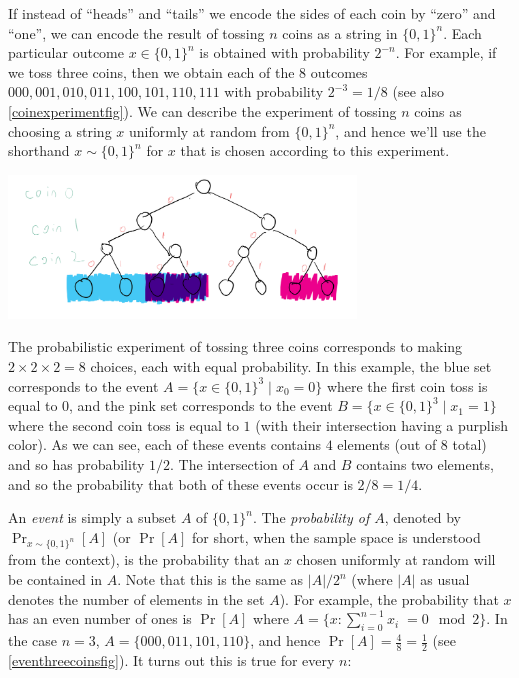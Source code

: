 If instead of ``heads'' and ``tails'' we encode the sides of each coin
by ``zero'' and ``one'', we can encode the result of tossing \(n\) coins
as a string in \(\{0,1\}^n\). Each particular outcome \(x\in \{0,1\}^n\)
is obtained with probability \(2^{-n}\). For example, if we toss three
coins, then we obtain each of the 8 outcomes
\(000,001,010,011,100,101,110,111\) with probability \(2^{-3}=1/8\) (see
also \cref{coinexperimentfig}). We can describe the experiment of
tossing \(n\) coins as choosing a string \(x\) uniformly at random from
\(\{0,1\}^n\), and hence we'll use the shorthand \(x\sim \{0,1\}^n\) for
\(x\) that is chosen according to this experiment.

\begin{marginfigure}
\centering
\includegraphics[width=\linewidth, height=1.5in, keepaspectratio]{../figure/coinexperiment.png}
\caption{The probabilistic experiment of tossing three coins corresponds
to making \(2\times 2 \times 2 = 8\) choices, each with equal
probability. In this example, the blue set corresponds to the event
\(A = \{ x\in \{0,1\}^3 \;|\; x_0 = 0 \}\) where the first coin toss is
equal to \(0\), and the pink set corresponds to the event
\(B = \{ x\in \{0,1\}^3 \;|\; x_1 = 1 \}\) where the second coin toss is
equal to \(1\) (with their intersection having a purplish color). As we
can see, each of these events contains \(4\) elements (out of \(8\)
total) and so has probability \(1/2\). The intersection of \(A\) and
\(B\) contains two elements, and so the probability that both of these
events occur is \(2/8 = 1/4\).}
\label{coinexperimentfig}
\end{marginfigure}

An \emph{event} is simply a subset \(A\) of \(\{0,1\}^n\). The
\emph{probability of \(A\)}, denoted by \(\Pr_{x\sim \{0,1\}^n}[A]\) (or
\(\Pr[A]\) for short, when the sample space is understood from the
context), is the probability that an \(x\) chosen uniformly at random
will be contained in \(A\). Note that this is the same as \(|A|/2^n\)
(where \(|A|\) as usual denotes the number of elements in the set
\(A\)). For example, the probability that \(x\) has an even number of
ones is \(\Pr[A]\) where
\(A=\{ x : \sum_{i=0}^{n-1} x_i \;= 0 \mod 2 \}\). In the case \(n=3\),
\(A=\{ 000,011,101,110 \}\), and hence
\(\Pr[A]=\tfrac{4}{8}=\tfrac{1}{2}\) (see \cref{eventhreecoinsfig}). It
turns out this is true for every \(n\):

